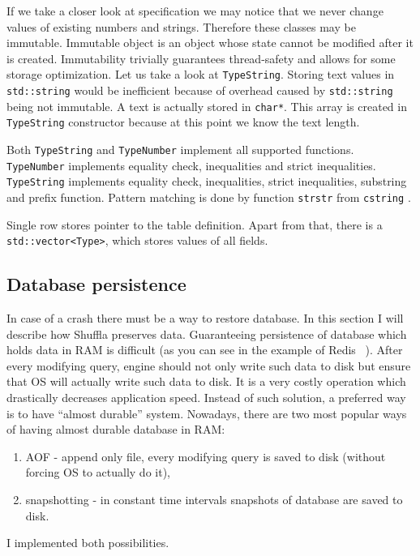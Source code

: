 \documentclass[10pt,a4paper]{article}
\begin{document}
If we take a closer look at specification we may notice that we never change values of existing numbers and strings. Therefore these classes may be immutable. Immutable object is an object whose state cannot be modified after it is created. Immutability trivially guarantees thread-safety and allows for some storage optimization. Let us take a look at \verb|TypeString|. Storing text values in \verb|std::string| would be inefficient because of overhead caused by \verb|std::string| being not immutable. A text is actually stored in \verb|char*|. This array is created in \verb|TypeString| constructor because at this point we know the text length.   

Both \verb|TypeString| and \verb|TypeNumber| implement all supported functions. \verb|TypeNumber| implements equality check, inequalities and strict inequalities. \verb|TypeString| implements equality check, inequalities, strict inequalities, substring and prefix function. Pattern matching is done by function \verb|strstr| from \verb|cstring| \cite{STRSTR}.

Single row stores pointer to the table definition. Apart from that, there is a \verb|std::vector<Type>|, which stores values of all fields.

\subsection{Database persistence}

In case of a crash there must be a way to restore database. In this section I will describe how Shuffla preserves data. Guaranteeing persistence of database which holds data in RAM is difficult (as you can see in the example of Redis ~\cite{REDPE}). After every modifying query, engine should not only write such data to disk but ensure that OS will actually write such data to disk. It is a very costly operation which drastically decreases application speed. Instead of such solution, a preferred way is to have “almost durable” system.
Nowadays, there are two most popular ways of having almost durable database in RAM:

\begin{enumerate}
\item AOF - append only file, every modifying query is saved to disk (without forcing OS to actually do it),
\item snapshotting - in constant time intervals snapshots of database are saved to disk.
\end{enumerate}
I implemented both possibilities. 
\end{document}

